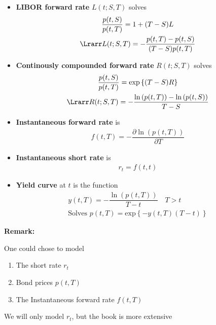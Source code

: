 \begin{itemize}
  \item\textbf{LIBOR forward rate} $L(t;S,T)$ solves 
    \begin{equation*}
      \begin{gathered}
        \dfrac{p(t,S)}{p(t,T)} = 1+(T-S)L\\
        \Lrarr L(t;S,T) = -\dfrac{p(t,T)-p(t,S)}{(T-S)p(t,T)}
      \end{gathered}
    \end{equation*}
    \par\bigskip
  \item\textbf{Continously compounded forward rate} $R(t;S,T)$ solves
    \begin{equation*}
      \begin{gathered}
        \dfrac{p(t,S)}{p(t,T)} =\text{exp}\left\{(T-S)R\right\}\\
        \Lrarr R(t;S,T) = -\dfrac{\ln{\left(p(t,T)\right)}-\ln{\left(p(t,S)\right)}}{T-S}
      \end{gathered}
    \end{equation*}
    \par\bigskip
  \item\textbf{Instantaneous forward rate} is
    \begin{equation*}
      \begin{gathered}
        f(t,T) = -\dfrac{\partial \ln{\left(p(t,T)\right)}}{\partial T}
      \end{gathered}
    \end{equation*}
    \par\bigskip
  \item\textbf{Instantaneous short rate} is 
    \begin{equation*}
      \begin{gathered}
        r_t = f(t,t)
      \end{gathered}
    \end{equation*}
    \par\bigskip
  \item\textbf{Yield curve} at $t$ is the function
    \begin{equation*}
      \begin{gathered}
        y(t,T) = -\dfrac{\ln{\left(p(t,T)\right)}}{T-t}\quad T>t\\
        \text{Solves } p(t,T) = \text{exp}\left\{-y(t,T)(T-t)\right\}
      \end{gathered}
    \end{equation*}
\end{itemize}
\par\bigskip
\noindent\textbf{Remark:}\par
\noindent One could chose to model\par
\begin{enumerate}[leftmargin=*]
  \item The short rate $r_t$
  \item Bond prices $p(t,T)$
  \item The Instantaneous forward rate $f(t,T)$
\end{enumerate}\par
\noindent We will only model $r_t$, but the book is more extensive

